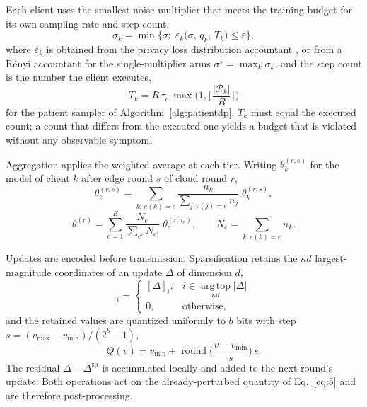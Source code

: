 Each client uses the smallest noise multiplier that meets the training budget
for its own sampling rate and step count,
\begin{equation}
\sigma_k = \min\big\{\sigma :\;
\varepsilon_k\big(\sigma,\, q_k,\, T_k\big)
\le \varepsilon\big\},
\tag{6}
\label{eq:6}
\end{equation}
where $\varepsilon_k$ is obtained from the privacy loss distribution accountant
\cite{ref33}, or from a R\'enyi accountant \cite{ref7, ref29} for the
single-multiplier arms $\sigma^{\star} = \max_k \sigma_k$, and the step count
is the number the client executes,
\begin{equation}
T_k = R\,\tau_e\,\max\!\Big(1, \Big\lfloor \frac{|\mathcal{P}_k|}{B} \Big\rfloor\Big)
\tag{7}
\label{eq:7}
\end{equation}
for the patient sampler of Algorithm~\ref{alg:patientdp}. $T_k$ must equal
the executed count; a count that differs from the executed one yields a budget
that is violated without any observable symptom.

Aggregation applies the weighted average at each tier. Writing
$\theta_k^{(r,s)}$ for the model of client $k$ after edge round $s$ of cloud
round $r$,
\begin{equation}
\theta_e^{(r,s)} = \!\!\sum_{k :\, e(k)=e}\!\!
\frac{n_k}{\sum_{j : e(j)=e} n_j}\; \theta_k^{(r,s)},
\tag{8}
\label{eq:8}
\end{equation}
\begin{equation}
\theta^{(r)} = \sum_{e=1}^{E} \frac{N_e}{\sum_{e'} N_{e'}}\;
\theta_e^{(r,\tau_e)},
\qquad
N_e = \!\!\sum_{k : e(k)=e}\!\! n_k .
\tag{9}
\label{eq:9}
\end{equation}

Updates are encoded before transmission. Sparsification retains the
$\kappa d$ largest-magnitude coordinates of an update $\Delta$ of dimension
$d$,
\begin{equation}
[\Delta^{\mathrm{sp}}]_i =
\begin{cases}
[\Delta]_i, & i \in \operatorname*{arg\,top}_{\kappa d} |\Delta| \\
0, & \text{otherwise,}
\end{cases}
\tag{10}
\label{eq:10}
\end{equation}
and the retained values are quantized uniformly to $b$ bits with step
$s = (v_{\max}-v_{\min})/(2^{b}-1)$,
\begin{equation}
Q(v) = v_{\min} + \operatorname{round}\!\Big(\frac{v - v_{\min}}{s}\Big)\, s .
\tag{11}
\label{eq:11}
\end{equation}
The residual $\Delta - \Delta^{\mathrm{sp}}$ is accumulated locally and added
to the next round's update. Both operations act on the already-perturbed
quantity of Eq.~\eqref{eq:5} and are therefore post-processing.


